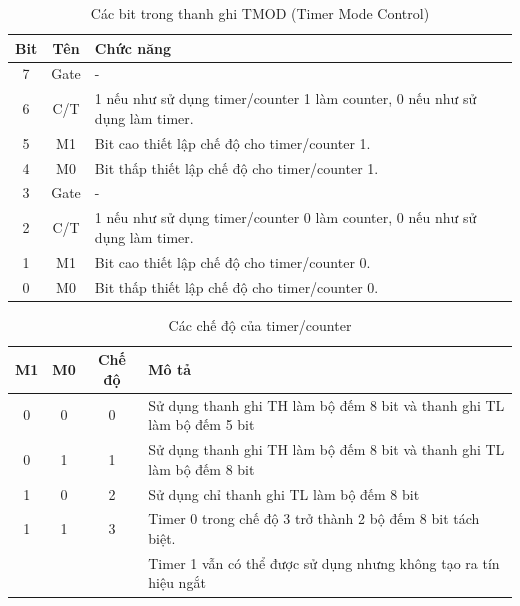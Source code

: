 \documentclass[../report.tex]{subfiles}
\begin{document}
\begin{table}[H]
\centering
\begin{tabular}{|c|c|l|}
\hline
\textbf{Bit} & \textbf{Tên} & \textbf{Chức năng} \\
\hline
7 & Gate & - \\
\hline
6 & C/T & 1 nếu như sử dụng timer/counter 1 làm counter, 0 nếu như sử dụng làm timer. \\
\hline
5 & M1 & Bit cao thiết lập chế độ cho timer/counter 1.  \\
\hline
4 & M0 & Bit thấp thiết lập chế độ cho timer/counter 1.  \\
\hline
3 & Gate & - \\
\hline
2 & C/T & 1 nếu như sử dụng timer/counter 0 làm counter, 0 nếu như sử dụng làm timer. \\
\hline
1 & M1 & Bit cao thiết lập chế độ cho timer/counter 0.  \\
\hline
0 & M0 & Bit thấp thiết lập chế độ cho timer/counter 0.  \\
\hline

\end{tabular}
\caption{Các bit trong thanh ghi TMOD (Timer Mode Control)}
\end{table}

\begin{table}[H]
\centering
\begin{tabular}{|c|c|c|l|}
\hline
\textbf{M1} & \textbf{M0} & \textbf{Chế độ} & \textbf{Mô tả}    \\
\hline
0 & 0 & 0 & Sử dụng thanh ghi TH làm bộ đếm 8 bit và thanh ghi TL làm bộ đếm 5 bit \\
\hline
0 & 1 & 1 & Sử dụng thanh ghi TH làm bộ đếm 8 bit và thanh ghi TL làm bộ đếm 8 bit \\
\hline
1 & 0 & 2 & Sử dụng chỉ thanh ghi TL làm bộ đếm 8 bit \\
\hline
1 & 1 & 3 & Timer 0 trong chế độ 3 trở thành 2 bộ đếm 8 bit tách biệt.  \\
& & & Timer 1 vẫn có thể được sử dụng nhưng không tạo ra tín hiệu ngắt \\
\hline
\end{tabular}
\caption{Các chế độ của timer/counter} 
\end{table}
\end{document}
